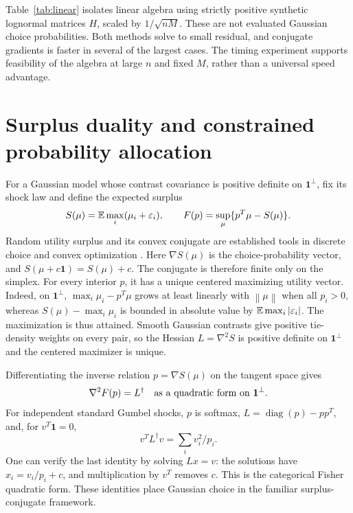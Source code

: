 \documentclass[11pt]{amsart}
\theoremstyle{definition}\newtheorem{example}[theorem]{Example}
\theoremstyle{remark}\newtheorem{remark}[theorem]{Remark}
\newcommand{\one}{\mathbf 1}\newcommand{\diag}{\operatorname{diag}}
\newcommand{\norm}[1]{\left\lVert#1\right\rVert}
\begin{document}
Table~\ref{tab:linear} isolates linear algebra using strictly positive synthetic lognormal matrices $H$, scaled by $1/\sqrt{nM}$. These are not evaluated Gaussian choice probabilities. Both methods solve to small residual, and conjugate gradients is faster in several of the largest cases. The timing experiment supports feasibility of the algebra at large $n$ and fixed $M$, rather than a universal speed advantage.
\begin{table}[htbp]\centering\small

\caption{Single-run linear algebra timings for synthetic positive Gram factors. Reduced time includes formation of the small matrix. CG uses the $D_0$ diagonal preconditioner and a rank-one gauge term.}\label{tab:linear}
\end{table}

\section{Surplus duality and constrained probability allocation}\label{app:geometry}
For a Gaussian model whose contrast covariance is positive definite on $\one^\perp$, fix its shock law and define the expected surplus
\[
 S(\mu)=\mathbb E\max_i(\mu_i+\varepsilon_i),\qquad
 F(p)=\sup_\mu\{p^T\mu-S(\mu)\}.
\]
Random utility surplus and its convex conjugate are established tools in discrete choice and convex optimization \cite{fosgerau2016,muller2019}. Here $\nabla S(\mu)$ is the choice-probability vector, and $S(\mu+c\one)=S(\mu)+c$. The conjugate is therefore finite only on the simplex. For every interior $p$, it has a unique centered maximizing utility vector. Indeed, on $\one^\perp$, $\max_i\mu_i-p^T\mu$ grows at least linearly with $\norm\mu$ when all $p_i>0$, whereas $S(\mu)-\max_i\mu_i$ is bounded in absolute value by $\mathbb E\max_i|\varepsilon_i|$. The maximization is thus attained. Smooth Gaussian contrasts give positive tie-density weights on every pair, so the Hessian $L=\nabla^2S$ is positive definite on $\one^\perp$ and the centered maximizer is unique.

Differentiating the inverse relation $p=\nabla S(\mu)$ on the tangent space gives
\begin{equation}\label{eq:dualmetric}
 \nabla^2F(p)=L^\dagger\quad\hbox{as a quadratic form on }\one^\perp.
\end{equation}
For independent standard Gumbel shocks, $p$ is softmax, $L=\diag(p)-pp^T$, and, for $v^T\one=0$,
\[
 v^TL^\dagger v=\sum_i v_i^2/p_i.
\]
One can verify the last identity by solving $Lx=v$: the solutions have $x_i=v_i/p_i+c$, and multiplication by $v^T$ removes $c$. This is the categorical Fisher quadratic form. These identities place Gaussian choice in the familiar surplus-conjugate framework.
\end{document}
